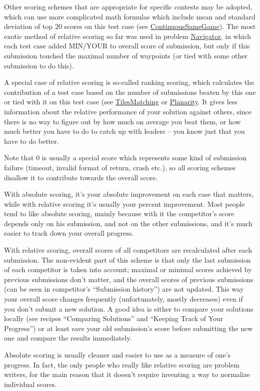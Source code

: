 \documentclass[]{article}
\begin{document}
Other scoring schemes that are appropriate for specific contests may be
adopted, which can use more complicated math formulas which include mean
and standard deviation of top 20 scores on this test case (see
\href{http://www.topcoder.com/longcontest/?module=ViewProblemStatement\&rd=10815\&pm=7789}{ContinuousSameGame}).
The most exotic method of relative scoring so far was used in problem
\href{http://www.topcoder.com/longcontest/?module=ViewProblemStatement\&rd=10845\&pm=7892}{Navigator},
in which each test case added MIN/YOUR to overall score of submission,
but only if this submission touched the maximal number of waypoints (or
tied with some other submission to do this).

A special case of relative scoring is so-called ranking scoring, which
calculates the contribution of a test case based on the number of
submissions beaten by this one or tied with it on this test case (see
\href{https://community.topcoder.com/longcontest/?module=ViewProblemStatement\&rd=13795\&pm=10410}{TilesMatching}
or
\href{https://community.topcoder.com/longcontest/?module=ViewProblemStatement\&rd=14272\&pm=10942}{Planarity}.
It gives less information about the relative performance of your
solution against others, since there is no way to figure out by how much
on average you beat them, or how much better you have to do to catch up
with leaders -- you know just that you have to do better.

Note that 0 is usually a special score which represents some kind of
submission failure (timeout, invalid format of return, crash etc.), so
all scoring schemes disallow it to contribute towards the overall score.

With absolute scoring, it's your absolute improvement on each case that
matters, while with relative scoring it's usually your percent
improvement. Most people tend to like absolute scoring, mainly because
with it the competitor's score depends only on his submission, and not
on the other submissions, and it's much easier to track down your
overall progress.

With relative scoring, overall scores of all competitors are
recalculated after each submission. The non-evident part of this scheme
is that only the last submission of each competitor is taken into
account; maximal or minimal scores achieved by previous submissions
don't matter, and the overall scores of previous submissions (can be
seen in competitor's ``Submission history'') are not updated. This way
your overall score changes frequently (unfortunately, mostly decreases)
even if you don't submit a new solution. A good idea is either to
compare your solutions locally (see recipes ``Comparing Solutions'' and
``Keeping Track of Your Progress'') or at least save your old
submission's score before submitting the new one and compare the results
immediately.

Absolute scoring is usually cleaner and easier to use as a measure of
one's progress. In fact, the only people who really like relative
scoring are problem writers, for the main reason that it doesn't require
inventing a way to normalize individual scores.
\end{document}
